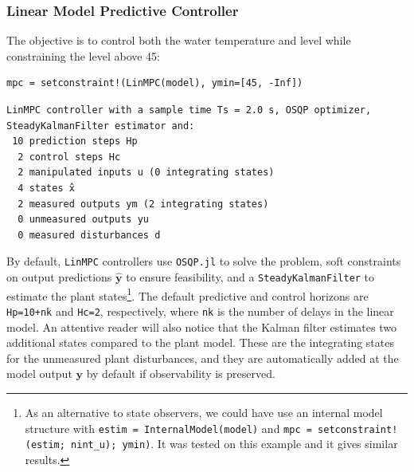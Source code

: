 \subsubsection{Linear Model Predictive Controller}

The objective is to control both the water temperature and level while constraining the level above 45:
\begin{verbatim}
mpc = setconstraint!(LinMPC(model), ymin=[45, -Inf])
\end{verbatim}
\spacerepl
\begin{verbatim}
LinMPC controller with a sample time Ts = 2.0 s, OSQP optimizer,
SteadyKalmanFilter estimator and:
 10 prediction steps Hp
  2 control steps Hc
  2 manipulated inputs u (0 integrating states)
  4 states x̂
  2 measured outputs ym (2 integrating states)
  0 unmeasured outputs yu
  0 measured disturbances d
\end{verbatim}
By default, \texttt{LinMPC} controllers use \texttt{OSQP.jl} \citep{osqp} to solve the problem, soft constraints on output predictions $\mathbf{\hat y}$ to ensure feasibility, and a \texttt{SteadyKalmanFilter} to estimate the plant states\footnote{As an alternative to state observers, we could have use an internal model structure with \texttt{estim = InternalModel(model)} and \texttt{mpc = setconstraint!(estim; nint\_u); ymin)}. It was tested on this example and it gives similar results.}. The default predictive and control horizons are \texttt{Hp=10+nk} and \texttt{Hc=2}, respectively, where \texttt{nk} is the number of delays in the linear model. An attentive reader will also notice that the Kalman filter estimates two additional states compared to the plant model. These are the integrating states for the unmeasured plant disturbances, and they are automatically added at the model output $\mathbf{y}$ by default if observability is preserved.


